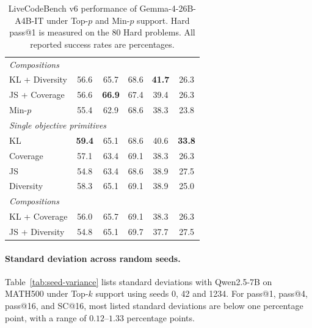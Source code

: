 \documentclass{article} %
\begin{document}
\begin{table}[!htbp]
{\begin{tabular}{lccccc}
\midrule
\multicolumn{6}{l}{\emph{Compositions}} \\
KL + Diversity
& 56.6 & 65.7 & 68.6  & \textbf{41.7} & 26.3\\
JS + Coverage
& 56.6 & \textbf{66.9} & 67.4 & 39.4 & 26.3 \\
\midrule
Min-$p$
& 55.4 & 62.9 & 68.6 & 38.3 & 23.8 \\
\midrule
\multicolumn{6}{l}{\emph{Single objective primitives}} \\
KL
& \textbf{59.4} & 65.1 & 68.6 & 40.6 & \textbf{33.8} \\
Coverage
& 57.1 & 63.4 & 69.1 & 38.3 & 26.3 \\
JS
& 54.8 & 63.4 & 68.6 & 38.9 & 27.5 \\
Diversity
& 58.3 & 65.1 & 69.1 & 38.9 & 25.0 \\
\midrule
\multicolumn{6}{l}{\emph{Compositions}} \\
KL + Coverage
& 56.0 & 65.7 & 69.1  & 38.3 & 26.3\\
JS + Diversity
& 54.8 & 65.1 & 69.7 & 37.7 & 27.5 \\
\bottomrule
\end{tabular}%
}
\caption{LiveCodeBench v6 performance of Gemma-4-26B-A4B-IT under
Top-$p$ and Min-$p$ support. Hard pass@1 is measured on the 80 Hard
problems. All reported success rates are percentages.}
\label{tab:livecodebench-gemma-performance}
\end{table}


\paragraph{Standard deviation across random seeds.} Table~\ref{tab:seed-variance} lists standard deviations with Qwen2.5-7B on MATH500 under Top-$k$ support using seeds 0, 42 and 1234. For pass@1, pass@4, pass@16, and SC@16, most listed standard deviations are below one percentage point, with a range of $0.12$--$1.33$ percentage points.
\end{document}
